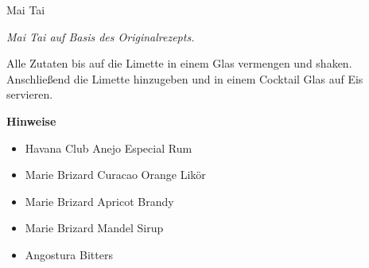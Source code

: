 \begin{recipe}{Mai Tai}{}{}

  \freeform
  \textit{Mai Tai auf Basis des Originalrezepts.}


  Alle Zutaten bis auf die Limette in einem Glas vermengen und shaken.
  Anschließend die Limette hinzugeben und in einem Cocktail Glas auf Eis servieren.

  \freeform
  \hrulefill

  \freeform
  \textbf{Hinweise}

  \begin{itemize}
    \item Havana Club Anejo Especial Rum
    \item Marie Brizard Curacao Orange Likör
    \item Marie Brizard Apricot Brandy
    \item Marie Brizard Mandel Sirup
    \item Angostura Bitters
  \end{itemize}

\end{recipe}

